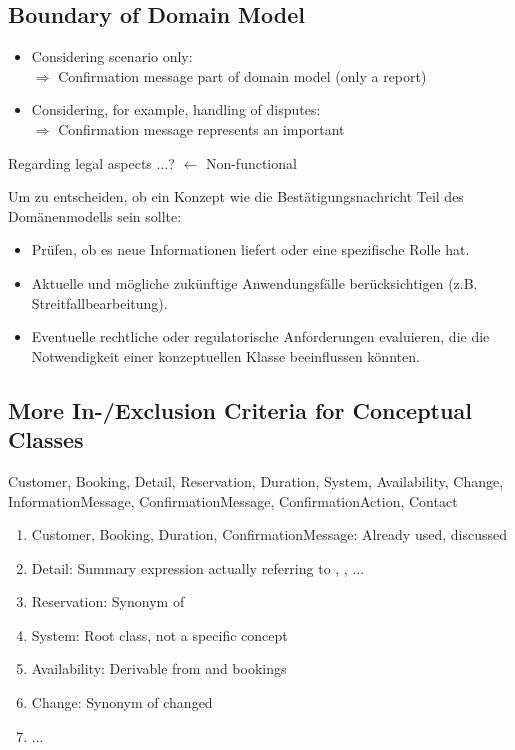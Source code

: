 \subsection{Boundary of Domain Model}
 
\begin{itemize}
    \item Considering  scenario only:\\
    $\Rightarrow$ Confirmation message  part of domain model (only a report)
    \item Considering, for example, handling of disputes:\\
    $\Rightarrow$ Confirmation message represents an important 
\end{itemize}
Regarding legal aspects ...? $\leftarrow$ Non-functional 
\begin{infoBox}
    Um zu entscheiden, ob ein Konzept wie die Bestätigungsnachricht Teil des Domänenmodells sein sollte:
    \begin{itemize}
        \item Prüfen, ob es neue Informationen liefert oder eine spezifische Rolle hat.
        \item Aktuelle und mögliche zukünftige Anwendungsfälle berücksichtigen (z.B. Streitfallbearbeitung).
        \item Eventuelle rechtliche oder regulatorische Anforderungen evaluieren, die die Notwendigkeit einer konzeptuellen Klasse beeinflussen könnten.
    \end{itemize}
\end{infoBox}

\subsection{More In-/Exclusion Criteria for Conceptual Classes}
\begin{defBox}[title=Candidate Conceptual Classes]
    Customer, Booking, Detail, Reservation, Duration, System, Availability, Change, InformationMessage, ConfirmationMessage, ConfirmationAction, Contact
\end{defBox}
\begin{enumerate}
    \item Customer, Booking, Duration, ConfirmationMessage: Already used, discussed
    \item Detail: Summary expression actually referring to , , ...
    \item Reservation: Synonym of 
    \item System: Root class, not a specific concept
    \item Availability: Derivable from  and bookings
    \item Change: Synonym of changed 
    \item ...
\end{enumerate}

